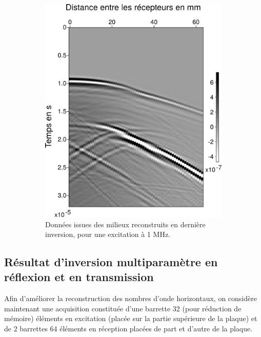 \documentclass[a4paper,11pt]{report} %
\begin{document}
\begin{figure}[!h]
\begin{subfigure}{0.45\textwidth}
		\includegraphics[width=\textwidth]{img/multi_trans/comp/data_built.png}
		\caption{Données issues des milieux reconstruits en dernière inversion, pour une excitation à 1 MHz.}
	\end{subfigure}
	\caption{\label{data1M}}
\end{figure}

\subsection{Résultat d'inversion multiparamètre en réflexion et en transmission}

Afin d'améliorer la reconstruction des nombres d'onde horizontaux, on considère maintenant une acquisition constituée d'une barrette 32 (pour réduction de mémoire) éléments en excitation (placée sur la partie supérieure de la plaque) et de 2 barrettes 64 éléments en réception placées de part et d'autre de la plaque.\\
\end{document}
